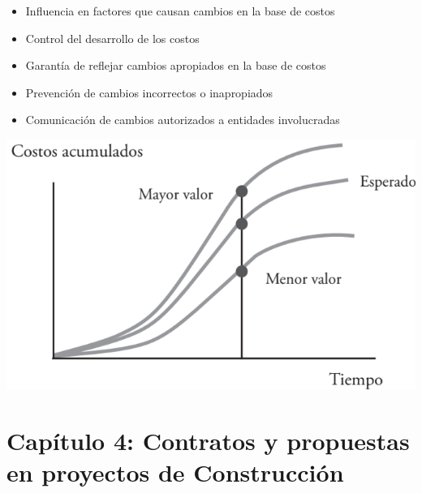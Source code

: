 \documentclass{article} %
\begin{document}
\begin{minipage}{0.45\textwidth}
    \begin{itemize}[label={},left=0pt,align=parleft]
        \item \begin{highlightbox}[levelone] Influencia en factores que causan cambios en la base de costos \end{highlightbox}
        \item \begin{highlightbox}[levelone] Control del desarrollo de los costos \end{highlightbox}
        \item \begin{highlightbox}[levelone] Garantía de reflejar cambios apropiados en la base de costos \end{highlightbox}
        \item \begin{highlightbox}[levelone] Prevención de cambios incorrectos o inapropiados \end{highlightbox}
        \item \begin{highlightbox}[levelone] Comunicación de cambios autorizados a entidades involucradas \end{highlightbox}
    \end{itemize}
\end{minipage}
\hfill
\begin{minipage}{0.5\textwidth}
    \centering
    \includegraphics[width=\textwidth]{curva_s.png}
\end{minipage}

\section{Capítulo 4: Contratos y propuestas en proyectos de Construcción}
\end{document}
